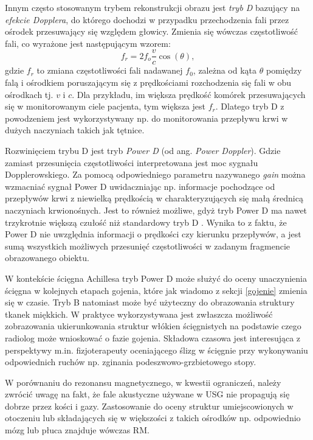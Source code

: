 Innym często stosowanym trybem rekonstrukcji obrazu jest \textit{tryb D} bazujący na \textit{efekcie Dopplera}, do którego dochodzi w przypadku przechodzenia fali przez ośrodek przesuwający się względem głowicy. Zmienia się wówczas częstotliwość fali, co wyrażone jest następującym wzorem:
\begin{equation}
f_r = 2 f_o\frac{v}{c}\cos(\theta),
\end{equation} 
gdzie $f_r$ to zmiana częstotliwości fali nadawanej $f_0$, zależna od kąta $\theta$ pomiędzy falą i ośrodkiem poruszającym się z prędkościami rozchodzenia się fali w obu ośrodkach tj. $v$ i $c$. Dla przykładu, im większa prędkość komórek przesuwających się w monitorowanym ciele pacjenta, tym większa jest $f_r$. Dlatego tryb D z powodzeniem jest wykorzystywany np. do monitorowania przepływu krwi w dużych naczyniach takich jak tętnice.

Rozwinięciem trybu D jest tryb \textit{Power D} (od ang. \textit{Power Doppler}). Gdzie zamiast przesunięcia częstotliwości interpretowana jest moc sygnału Dopplerowskiego. Za pomocą odpowiedniego parametru nazywanego \textit{gain} można wzmacniać sygnał Power D uwidaczniając np. informacje pochodzące od przepływów krwi z niewielką prędkością w charakteryzujących się małą średnicą naczyniach krwionośnych. Jest to również możliwe, gdyż tryb Power D ma nawet trzykrotnie większą czułość niż standardowy tryb D \cite{Babcock1996}. Wynika to z faktu, że Power D nie uwzględnia informacji o prędkości czy kierunku przepływów, a jest sumą wszystkich możliwych przesunięć częstotliwości w zadanym fragmencie obrazowanego obiektu.

W kontekście ścięgna Achillesa tryb Power D może służyć do oceny unaczynienia ścięgna w kolejnych etapach gojenia, które jak wiadomo z sekcji \ref{gojenie} zmienia się w czasie. Tryb B natomiast może być użyteczny do obrazowania struktury tkanek miękkich. W praktyce wykorzystywana jest zwłaszcza możliwość zobrazowania ukierunkowania struktur włókien ścięgnistych na podstawie czego radiolog może wnioskować o fazie gojenia. Składowa czasowa jest interesująca z perspektywy m.in. fizjoterapeuty oceniającego ślizg w ścięgnie przy wykonywaniu odpowiednich ruchów np. zginania podeszwowo-grzbietowego stopy. 

W porównaniu do rezonansu magnetycznego, w kwestii ograniczeń, należy zwrócić uwagę na fakt, że fale akustyczne używane w USG nie propagują się dobrze przez kości i gazy. Zastosowanie do oceny struktur umiejscowionych w otoczeniu lub składających się w większości z takich ośrodków np. odpowiednio mózg lub płuca znajduje wówczas RM. 

